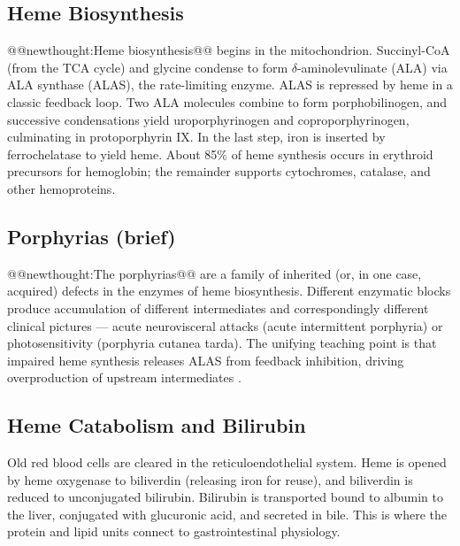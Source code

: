 \documentclass{tufte-handout}
\makeatletter
\def\newthought#1{@@newthought:#1@@}
\makeatother
\begin{document}
\subsection{Heme Biosynthesis}
\newthought{Heme biosynthesis} begins in the mitochondrion. Succinyl-CoA (from the TCA cycle) and glycine condense to form $\delta$-aminolevulinate (ALA) via ALA synthase (ALAS), the rate-limiting enzyme. ALAS is repressed by heme in a classic feedback loop. Two ALA molecules combine to form porphobilinogen, and successive condensations yield uroporphyrinogen and coproporphyrinogen, culminating in protoporphyrin IX. In the last step, iron is inserted by ferrochelatase to yield heme. About 85\% of heme synthesis occurs in erythroid precursors for hemoglobin; the remainder supports cytochromes, catalase, and other hemoproteins.

\subsection{Porphyrias (brief)}
\newthought{The porphyrias} are a family of inherited (or, in one case, acquired) defects in the enzymes of heme biosynthesis. Different enzymatic blocks produce accumulation of different intermediates and correspondingly different clinical pictures --- acute neurovisceral attacks (acute intermittent porphyria) or photosensitivity (porphyria cutanea tarda). The unifying teaching point is that impaired heme synthesis releases ALAS from feedback inhibition, driving overproduction of upstream intermediates \citep{puyPorphyrias2010}.

\subsection{Heme Catabolism and Bilirubin}
Old red blood cells are cleared in the reticuloendothelial system. Heme is opened by heme oxygenase to biliverdin (releasing iron for reuse), and biliverdin is reduced to unconjugated bilirubin. Bilirubin is transported bound to albumin to the liver, conjugated with glucuronic acid, and secreted in bile. This is where the protein and lipid units connect to gastrointestinal physiology.
\end{document}
